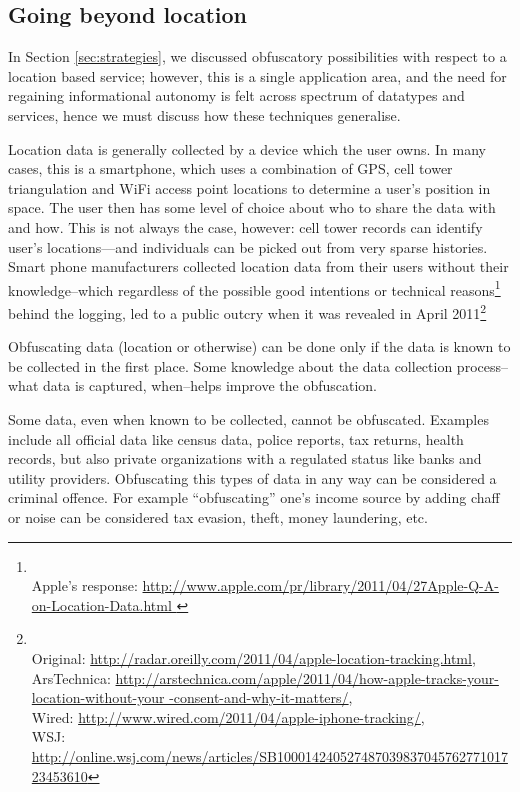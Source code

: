 \documentclass{IOS-Book-Article}     %
\newcommand{\tbox}[3][red]{{
\color{#1}\noindent{
   \fbox{\scriptsize{ {\bf #2} \textsl{#3}}}
   \vspace{2pt}
}
}}
\newcommand{\todo}[1]{\tbox{TODO:}{#1}}
\begin{document}
\subsection{Going beyond location}

In Section \ref{sec:strategies}, we discussed obfuscatory possibilities with
respect to a location based service; however, this is a single application area,
and the need for regaining informational autonomy is felt across spectrum of
datatypes and services, hence we must discuss how these techniques generalise.

Location data is generally collected by a device which the user owns. In many
cases, this is a smartphone, which uses a combination of GPS, cell tower
triangulation and WiFi access point locations to determine a user's position in
space. The user then has some level of choice about who to share the data with
and how. This is not always the case, however: cell tower records can identify
user's locations---and individuals can be picked out from very sparse
histories\cite{montjoye2013Unique}. Smart phone manufacturers collected 
location data from their users without their knowledge--which regardless of the 
possible good intentions or technical reasons\footnote{\\Apple's response: 
\url{http://www.apple.com/pr/library/2011/04/27Apple-Q-A-on-Location-Data.html 
}} behind the logging, led to a public outcry when it was revealed in April 
2011\footnote{\todo{pick one}\\Original: 
\url{http://radar.oreilly.com/2011/04/apple-location-tracking.html},
\\ArsTechnica: \url{ 
http://arstechnica.com/apple/2011/04/how-apple-tracks-your-location-without-your 
-consent-and-why-it-matters/}, \\Wired: 
\url{http://www.wired.com/2011/04/apple-iphone-tracking/}, \\WSJ: \url{ 
http://online.wsj.com/news/articles/SB10001424052748703983704576277101723453610} 
}

Obfuscating data (location or otherwise) can be done only if the data is 
known to be collected in the first place. Some knowledge about the data 
collection process--what data is captured, when--helps improve the obfuscation. 

Some data, even when known to be collected, cannot be obfuscated. Examples 
include all official data like census data, police reports, tax returns, health 
records, but also private organizations with a regulated status like banks and 
utility providers. Obfuscating this types of data in any way can be considered 
a criminal offence. 
For example ``obfuscating'' one's income source by adding chaff or noise can be 
considered tax evasion, theft, money laundering, etc.
\end{document}
